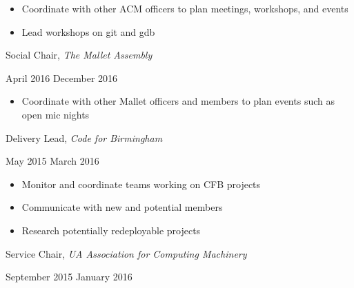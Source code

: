 \documentclass[11pt]{article}
\begin{document}
\begin{itemize}
  \item Coordinate with other ACM officers to plan meetings, workshops, and events
  \item Lead workshops on git and gdb
\end{itemize}

\vspace{0.4em}
\begin{minipage}[t]{0.65\textwidth}
\flushleft
Social Chair, \textit{The Mallet Assembly}\\
\end{minipage}
\begin{minipage}[t]{0.30\textwidth}
\flushright
April 2016 \space \textemdash \space December 2016\\
\end{minipage}

\begin{itemize}
  \item Coordinate with other Mallet officers and members to plan events such as open mic nights
\end{itemize}

\vspace{0.4em}
\begin{minipage}[t]{0.65\textwidth}
\flushleft
Delivery Lead, \textit{Code for Birmingham}\\
\end{minipage}
\begin{minipage}[t]{0.30\textwidth}
\flushright
May 2015 \space \textemdash \space March 2016\\
\end{minipage}

\begin{itemize}
  \item Monitor and coordinate teams working on CFB projects
  \item Communicate with new and potential members
  \item Research potentially redeployable projects
\end{itemize}

\vspace{0.4em}
\begin{minipage}[t]{0.65\textwidth}
\flushleft
Service Chair, \textit{UA Association for Computing Machinery}\\
\end{minipage}
\begin{minipage}[t]{0.3\textwidth}
\flushright
September 2015 \space \textemdash \space January 2016\\
\end{minipage}
\end{document}
